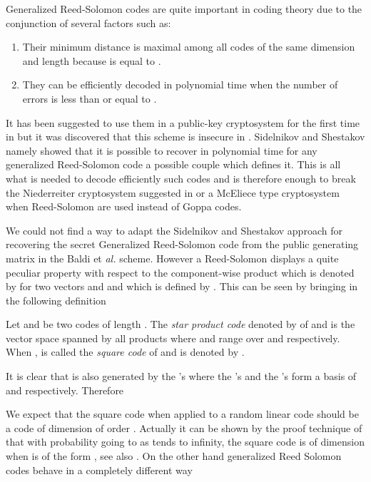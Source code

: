 \documentclass[runningheads,11pt]{llncs}
\begin{document}
Generalized Reed-Solomon codes are quite important in coding theory
due to the conjunction of several factors such as:
\begin{enumerate}
\item Their minimum distance  is maximal among all codes of the
  same dimension  and length   because  is equal to .
\item They can be efficiently decoded in polynomial time when the number of errors
is less than or equal to . 
\end{enumerate}
It has been suggested to use them in a public-key cryptosystem for the first time in \cite{Niederreiter86} but 
it was discovered that this scheme is insecure in \cite{SidelShesta92}. Sidelnikov and Shestakov namely showed that it is 
possible  
to recover in polynomial time for any generalized Reed-Solomon code a possible couple  which defines it.
This is all what is needed to decode efficiently such codes and is therefore enough to break the Niederreiter cryptosystem suggested in 
\cite{Niederreiter86} or a McEliece type cryptosystem \cite{McEliece78} when Reed-Solomon are used instead of Goppa codes.

We could not find a way to adapt the Sidelnikov and Shestakov approach 
for recovering the secret Generalized Reed-Solomon code from the public generating matrix  in the 
Baldi et \textit{al.} scheme. 
However a Reed-Solomon displays a quite peculiar property with respect to the component-wise
product which is denoted by   for two vectors 
  and  and which is defined by
 . This can be seen by bringing in the following definition


\begin{definition}
Let  and  be two codes of length . The
\emph{star product code} denoted by  of  and  is the vector space
spanned by all products  where  and  range over  and  respectively.
When ,   is called the \emph{square code} of 
and is denoted by .
\end{definition}


It is clear that  is also generated by the 's where the 's and the
's form a basis of  and  respectively.
Therefore
\begin{proposition}
  
\end{proposition}
We expect that the square code when applied to a random linear code should be a code of dimension of
order . Actually it can be shown by the proof technique of 
\cite{FGOPT11a}  that with probability 
going to  as  tends to infinity, the square  
code is of dimension  when  is of the form , see also
\cite{MP12a}.
 On the other hand generalized Reed Solomon codes behave
in a completely different way
\end{document}

